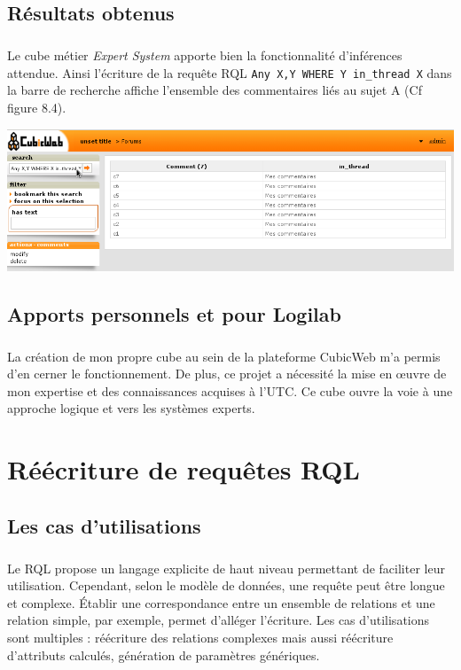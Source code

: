 \documentclass {report}
\begin{document}
\section{Résultats obtenus}
\paragraph{}
Le cube métier \textit{Expert System} apporte bien la fonctionnalité d'inférences attendue. Ainsi l'écriture de la requête RQL \verb+Any X,Y WHERE Y in_thread X+ dans la barre de recherche affiche l'ensemble des commentaires liés au sujet A (Cf figure 8.4).

\begin{center}
\includegraphics[scale=0.7]{in_thread.png}
\end{center}

\section{Apports personnels et pour Logilab}
\paragraph{}
La création de mon propre cube au sein de la plateforme CubicWeb m'a permis d'en cerner le fonctionnement. De plus, ce projet a nécessité la mise en œuvre de mon expertise et des connaissances acquises à l'UTC. Ce cube ouvre la voie à une approche logique et vers les systèmes experts.


\chapter{Réécriture de requêtes RQL}

\section{Les cas d'utilisations}
\paragraph{}
Le RQL propose un langage explicite de haut niveau permettant de faciliter leur utilisation. Cependant, selon le modèle de données, une requête peut être longue et complexe. Établir une correspondance entre un ensemble de relations et une relation simple, par exemple, permet d'alléger l'écriture. Les cas d'utilisations sont multiples : réécriture des relations complexes mais aussi réécriture d'attributs calculés, génération de paramètres génériques.
\end{document}
